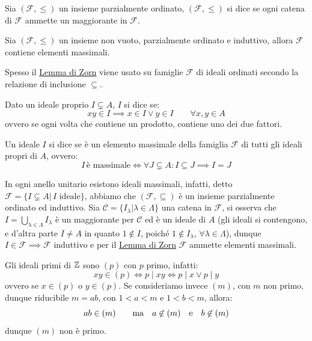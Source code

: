 \documentclass[11pt]{scrartcl}
\begin{document}
\begin{definition}
    Sia $(\mathcal{F}, \leqslant)$ un insieme parzialmente ordinato, $(\mathcal{F}, \leqslant)$ si dice  se ogni catena di $\mathcal{F}$
    ammette un maggiorante in $\mathcal{F}$.
\end{definition}

\begin{lemma}
    \label{zorn}
    Sia $(\mathcal{F}, \leqslant)$ un insieme non vuoto, parzialmente ordinato e induttivo, allora $\mathcal{F}$ contiene elementi massimali.
\end{lemma}

\begin{remark}
    Spesso il \hyperref[zorn]{Lemma di Zorn} viene usato su famiglie $\mathcal{F}$ di ideali ordinati secondo la relazione di inclusione $\subseteq$.
\end{remark}

\begin{definition}
    Dato un ideale proprio $I \subsetneq A$, $I$ si dice  se:
        \[ xy \in I \implies x \in I \vee y \in I \qquad \forall x,y \in A
            \]
    ovvero se ogni volta che contiene un prodotto, contiene uno dei due fattori.
\end{definition}

\begin{definition}
    Un ideale $I$ si dice  se è un elemento massimale della famiglia $\mathcal{F}$ di tutti gli ideali propri di $A$, ovvero:
        \[ I \, \text{è massimale} \iff \forall J \subsetneq A : I \subseteq J \implies I = J
            \]
\end{definition}

In ogni anello unitario esistono ideali massimali, infatti, detto $\mathcal{F} = \{I \subsetneq A | \, \text{$I$ ideale}\}$, abbiamo che $(\mathcal{F}, \subseteq)$ è un insieme parzialmente ordinato ed induttivo.
Sia $\mathscr{C} = \{I_\lambda | \lambda \in \Lambda\}$ una catena in $\mathcal{F}$, si osserva che $I = \bigcup_{\lambda \in \Lambda}I_\lambda$ è un maggiorante per $\mathscr{C}$ ed è un ideale di $A$ (gli ideali si 
contengono, e d'altra parte $I \ne A$ in quanto $1 \not\in I$, poiché $1 \not \in I_\lambda$, $\forall \lambda \in \Lambda$), dunque $I \in \mathcal{F} \implies \mathcal{F}$ induttivo e per il \hyperref[zorn]{Lemma di Zorn} $\mathcal{F}$
ammette elementi massimali.

\begin{example}
    Gli ideali primi di $\mathbb Z$ sono $(p)$ con $p$ primo, infatti:
    \[ xy \in (p) \iff p \mid xy \iff p \mid x \vee p \mid y
        \]
    ovvero se $x \in (p)$ o $y \in (p)$. Se consideriamo invece $(m)$, con $m$ non primo, dunque riducibile $m = ab$, con $1<a<m$ e $1<b<m$, allora:
    \[ ab \in (m) \qquad \text{ma} \quad a \not\in (m) \quad \text e \quad b \not\in (m)
        \]
    dunque $(m)$ non è primo.
\end{example}
\end{document}
